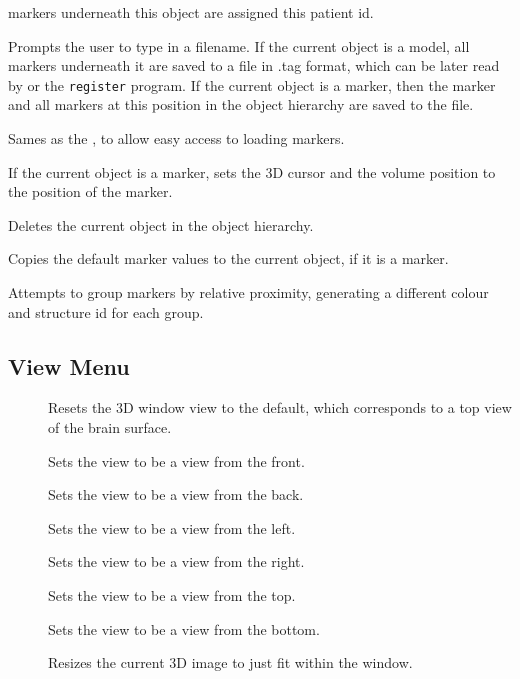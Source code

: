 \begin{description}
        markers underneath this object are assigned this patient id.
\item[\menutwo{Markers}{Save Mrkrs as .tag}]  Prompts the user to type in a
        filename.  If the current object is a model, all markers underneath
        it are saved to a file in .tag format, which can be later read by 
        \display or the {\tt register} program.  If the current object is
        a marker, then the marker and all markers at this position in the
        object hierarchy are saved to the file.
\item[\menutwo{Markers}{Load Markers}]  Sames as the ,
        to allow easy access to loading markers.
\item[\menutwo{Markers}{Move to Marker}]  If the current object is a marker,
        sets the 3D cursor and the volume position to the position of the
        marker.
\item[\menuthree{Markers}{Delete Object}{Really Delete}]  Deletes the current object in the
        object hierarchy.
\item[\menutwo{Markers}{Defaults -> Current}]  Copies the default marker
        values to the current object, if it is a marker.
\item[\menutwo{Markers}{Classify Markers}]  Attempts to group markers by
        relative proximity, generating a different colour and structure id
        for each group.
\end{description}

\subsection{View Menu}

\begin{description}
\item[]  Resets the 3D window view to the default,
        which corresponds to a top view of the brain surface.
\item[]  Sets the view to be a view from the front.
\item[]  Sets the view to be a view from the back.
\item[]  Sets the view to be a view from the left.
\item[]  Sets the view to be a view from the right.
\item[]  Sets the view to be a view from the top.
\item[]  Sets the view to be a view from the bottom.
\item[]  Resizes the current 3D image to just fit
                                 within the window.
\end{description}

